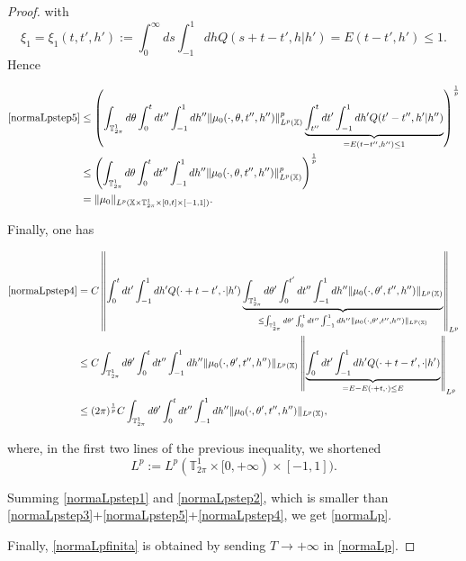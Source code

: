 \documentclass[a4paper,10pt,reqno]{amsart}
\numberwithin{equation}{subsection}
\numberwithin{figure}{subsection}
\begin{document}
\begin{proof}
with
\[
\xi_1=\xi_1(t,t',h'):=\int_0^{\infty}ds\int_{-1}^1dhQ(s+t-t',h|h')=E(t-t',h')\leq1.
\]
Hence

{\footnotesize\begin{align*}
\eqref{normaLpstep5}&\leq\left(\int_{\mathbb{T}^1_{2\pi}}d\theta\int_0^tdt''\int_{-1}^1dh''\|\mu_0(\cdot,\theta,t'',h'')\|_{L^p(\mathbb{X})}^p\underbrace{\int_{t''}^tdt'\int_{-1}^1dh'Q(t'-t'',h'|h'')}_{=E(t-t'',h'')\leq1}\right)^{\frac{1}{p}}
\\
&\leq\left(\int_{\mathbb{T}^1_{2\pi}}d\theta\int_0^tdt''\int_{-1}^1dh''\|\mu_0(\cdot,\theta,t'',h'')\|_{L^p(\mathbb{X})}^p\right)^{\frac{1}{p}}
\\
&=\|\mu_0\|_{L^p(\mathbb{X}\times\mathbb{T}^1_{2\pi}\times[0,t]\times\mathbb[-1,1])}.
\end{align*}}

Finally, one has

{\footnotesize\begin{align*}
\eqref{normaLpstep4}&=C\left\|\int_0^tdt'\int_{-1}^1dh'Q(\cdot+t-t',\cdot|h')\underbrace{\int_{\mathbb{T}^1_{2\pi}}d\theta'\int_0^{t'}dt''\int_{-1}^1dh''\|\mu_0(\cdot,\theta',t'',h'')\|_{L^p(\mathbb{X})}}_{\leq\int_{\mathbb{T}^1_{2\pi}}d\theta'\int_0^tdt''\int_{-1}^1dh''\|\mu_0(\cdot,\theta',t'',h'')\|_{L^p(\mathbb{X})}}\right\|_{L^p}
\\
&\leq C\int_{\mathbb{T}^1_{2\pi}}d\theta'\int_0^tdt''\int_{-1}^1dh''\|\mu_0(\cdot,\theta',t'',h'')\|_{L^p(\mathbb{X})}\left\|\underbrace{\int_0^tdt'\int_{-1}^1dh'Q(\cdot+t-t',\cdot|h')}_{=E-E(\cdot+t,\cdot)\leq E}\right\|_{L^p}
\\
&\leq(2\pi)^{\frac{1}{p}} C\int_{\mathbb{T}^1_{2\pi}}d\theta'\int_0^tdt''\int_{-1}^1dh''\|\mu_0(\cdot,\theta',t'',h'')\|_{L^p(\mathbb{X})},
\end{align*}}

where, in the first two lines of the previous inequality, we shortened
\[
L^p:=L^p(\mathbb{T}^1_{2\pi}\times[0,+\infty)\times[-1,1]).
\]

Summing \eqref{normaLpstep1} and \eqref{normaLpstep2}, which is smaller than \eqref{normaLpstep3}+\eqref{normaLpstep5}+\eqref{normaLpstep4}, we get \eqref{normaLp}.

Finally, \eqref{normaLpfinita} is obtained by sending $T\to+\infty$ in \eqref{normaLp}.
\end{proof}
\end{document}
